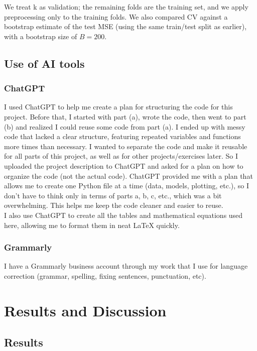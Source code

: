 \documentclass[amssymb,twocolumn,aps,floatfix]{revtex4-2}
\begin{document}
We treat k as validation; the remaining folds are the training set, and we apply preprocessing only to the training folds. 
We also compared CV against a bootstrap estimate of the test MSE (using the same train/test split as earlier), with a bootstrap size of $B=200$.


\subsection{Use of AI tools}
 \label{subsubsec:ai_method}
	
\subsubsection{ChatGPT}
I used ChatGPT to help me create a plan for structuring the code for this project. Before that, I started with part (a), wrote the code, then went to part (b) and realized I could reuse some code from part (a). I ended up with messy code that lacked a clear structure, featuring repeated variables and functions more times than necessary. I wanted to separate the code and make it reusable for all parts of this project, as well as for other projects/exercises later. So I uploaded the project description to ChatGPT and asked for a plan on how to organize the code (not the actual code). ChatGPT provided me with a plan that allows me to create one Python file at a time (data, models, plotting, etc.), so I don’t have to think only in terms of parts a, b, c, etc., which was a bit overwhelming. This helps me keep the code cleaner and easier to reuse. \\

I also use ChatGPT to create all the tables and mathematical equations used here, allowing me to format them in neat LaTeX quickly. 

\subsubsection{Grammarly}

I have a Grammarly business account through my work that I use for language correction (grammar, spelling, fixing sentences, punctuation, etc). 
	
\section{Results and Discussion}\label{section:results} 

\subsection{Results}
\end{document}
